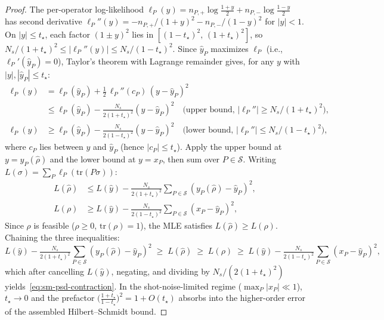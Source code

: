 \documentclass[twocolumn,prx,aps,superscriptaddress,longbibliography]{revtex4-2}
\begin{document}
\begin{proof}
The per-operator log-likelihood
$\ell_P(y) = n_{P,+}\log\frac{1+y}{2}
+ n_{P,-}\log\frac{1-y}{2}$
has second derivative
$\ell_P''(y) = -n_{P,+}/(1{+}y)^2 - n_{P,-}/(1{-}y)^2$
for $|y| < 1$.
On $|y| \le t_\star$, each factor $(1 \pm y)^2$ lies in
$[(1{-}t_\star)^2,\,(1{+}t_\star)^2]$, so
$N_s/(1{+}t_\star)^2 \le |\ell_P''(y)| \le N_s/(1{-}t_\star)^2$.
Since $\hat{y}_P$ maximizes $\ell_P$
(i.e., $\ell_P'(\hat{y}_P) = 0$),
Taylor's theorem with Lagrange remainder gives,
for any $y$ with $|y|, |\hat{y}_P| \le t_\star$:
\begin{align*}
  \ell_P(y) &= \ell_P(\hat{y}_P)
    + \tfrac{1}{2}\,\ell_P''(c_P)\,(y - \hat{y}_P)^2 \\
  &\le \ell_P(\hat{y}_P) - \tfrac{N_s}{2(1{+}t_\star)^2}(y - \hat{y}_P)^2
    \quad \text{(upper bound, $|\ell_P''| \ge N_s/(1{+}t_\star)^2$),} \\
  \ell_P(y) &\ge \ell_P(\hat{y}_P)
    - \tfrac{N_s}{2(1 - t_\star)^2}(y - \hat{y}_P)^2
    \quad \text{(lower bound, $|\ell_P''| \le N_s/(1{-}t_\star)^2$),}
\end{align*}
where $c_P$ lies between $y$ and $\hat{y}_P$
(hence $|c_P| \le t_\star$).
Apply the upper bound at $y = y_P(\hat\rho)$ and the lower
bound at $y = x_P$, then sum over $P \in \mathcal{S}$.
Writing $L(\sigma) = \sum_P \ell_P(\mathrm{tr}(P\sigma))$:
\begin{align*}
  L(\hat\rho) &\le L(\hat{y})
    - \tfrac{N_s}{2(1{+}t_\star)^2}\textstyle\sum_{P \in \mathcal{S}}
    (y_P(\hat\rho) - \hat{y}_P)^2, \\
  L(\rho) &\ge L(\hat{y})
    - \tfrac{N_s}{2(1 - t_\star)^2}\textstyle\sum_{P \in \mathcal{S}}
    (x_P - \hat{y}_P)^2,
\end{align*}
Since $\rho$ is feasible ($\rho \ge 0$,
$\mathrm{tr}(\rho) = 1$), the MLE satisfies
$L(\hat\rho) \ge L(\rho)$.  Chaining the three inequalities:
\[
  L(\hat{y}) - \tfrac{N_s}{2(1{+}t_\star)^2}
  \sum_{P \in \mathcal{S}} (y_P(\hat\rho) - \hat{y}_P)^2
  \;\ge\;
  L(\hat\rho) \;\ge\; L(\rho)
  \;\ge\;
  L(\hat{y}) - \tfrac{N_s}{2(1 - t_\star)^2}
  \sum_{P \in \mathcal{S}} (x_P - \hat{y}_P)^2,
\]
which after cancelling $L(\hat{y})$, negating, and dividing by
$N_s/(2(1{+}t_\star)^2)$ yields~\eqref{eq:sm-psd-contraction}.
In the shot-noise-limited regime ($\max_P |x_P| \ll 1$),
$t_\star \to 0$ and the prefactor
$\bigl(\frac{1+t_\star}{1-t_\star}\bigr)^{2}
= 1 + O(t_\star)$ absorbs into the
higher-order error of the assembled Hilbert--Schmidt bound.


\end{proof}
\end{document}
